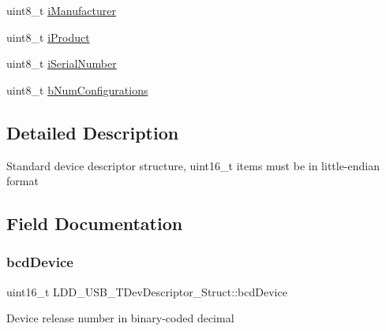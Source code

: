 \begin{DoxyCompactItemize}
\item 
uint8\+\_\+t \hyperlink{struct_l_d_d___u_s_b___t_dev_descriptor___struct_a08ef46915ceb0b4b3cda58d586522ddf}{i\+Manufacturer}
\item 
uint8\+\_\+t \hyperlink{struct_l_d_d___u_s_b___t_dev_descriptor___struct_a224063a7358f7be5c56f88576d380a38}{i\+Product}
\item 
uint8\+\_\+t \hyperlink{struct_l_d_d___u_s_b___t_dev_descriptor___struct_a20a21f9aa226246239ca51ec4fd9438f}{i\+Serial\+Number}
\item 
uint8\+\_\+t \hyperlink{struct_l_d_d___u_s_b___t_dev_descriptor___struct_ab1e1436818c6ff3060a56bb136f07648}{b\+Num\+Configurations}
\end{DoxyCompactItemize}


\subsection{Detailed Description}
Standard device descriptor structure, uint16\+\_\+t items must be in little-\/endian format 

\subsection{Field Documentation}
\mbox{\label{struct_l_d_d___u_s_b___t_dev_descriptor___struct_ab5ed57c271bb34676c0074942f40fd24}} 
\subsubsection{\texorpdfstring{bcd\+Device}{bcdDevice}}
{\footnotesize\ttfamily uint16\+\_\+t L\+D\+D\+\_\+\+U\+S\+B\+\_\+\+T\+Dev\+Descriptor\+\_\+\+Struct\+::bcd\+Device}

Device release number in binary-\/coded decimal \mbox{\label{struct_l_d_d___u_s_b___t_dev_descriptor___struct_af78882a5888196664c86e334f2be35c2}} 

